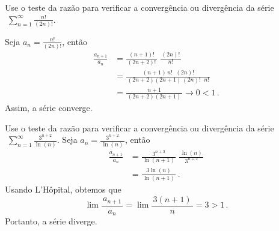 \begin{example}
  Use o teste da razão para verificar a convergência ou divergência da série
  \(\;
    \sum_{n=1}^\infty\frac{n!}{(2n)!}
  \).

  \solution
  Seja
  \(
    a_n = \frac{n!}{(2n)!}
  \),
  então
  \begin{align*}
  	\frac{a_{n+1}}{a_n} & = \frac{(n+1)!}{\,(2n+2)!\,}\;\frac{\,(2n)!\,}{n!}      \\[3mm]
  	                    & = \frac{(n+1)\, n!\;\;(2n)! }{\,(2n+2)(2n+1)\,(2n)!\;\; n!\,} \\[3mm]
  	                    & = \frac{n+1}{\,(2n+2)(2n+1)\,}
  	                        \to 0 < 1    \,.
  \end{align*}
  Assim, a série converge.
\end{example}

\begin{example}
  Use o teste da razão para verificar a convergência ou divergência da série
  \(\;
    \sum_{n=1}^\infty\frac{3^{n+2}}{\ln(n)}
  \).
  \solution
  Seja
  \(
    a_n = \frac{\,3^{n+2}\,}{\,\ln(n)\,}
  \),
  então
  \begin{align*}
    \frac{a_{n+1}}{a_n} & = \frac{3^{n+3}}{\,\ln(n+1)\,} \; \frac{\,\ln(n)\,}{\,3^{n+2}\,} \\[3mm]
                        & = \frac{3\ln(n)}{\,\ln(n+1)\,}    \,.
  \end{align*}
  Usando L'Hôpital, obtemos que
  \[
      \lim \frac{\,a_{n+1}\,}{a_n} =
      \lim \frac{\,3(n+1)\,}{n}    = 3 > 1     \,.
  \]
  Portanto, a série diverge.
\end{example}

